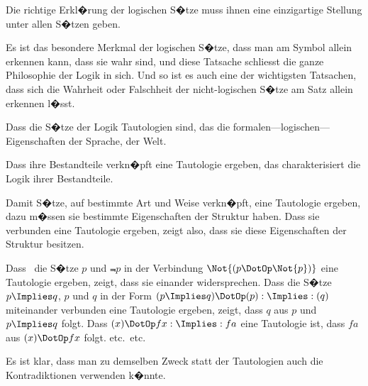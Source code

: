\begin{propositions}
{Die richtige Erkl�rung der logischen S�tze
muss ihnen eine einzigartige Stellung unter allen
S�tzen geben.}


{Es ist das besondere Merkmal der logischen
S�tze, dass man am Symbol allein erkennen kann,
dass sie wahr sind, und diese Tatsache schliesst
die ganze Philosophie der Logik in sich. Und
so ist es auch eine der wichtigsten Tatsachen, dass
sich die Wahrheit oder Falschheit der nicht-logischen
S�tze  am Satz allein erkennen
l�sst.}


{Dass die S�tze der Logik Tautologien sind,
das  die for\-ma\-len---lo\-gi\-schen---Ei\-gen\-schaf\-ten
der Sprache, der Welt.

Dass ihre Bestandteile  verkn�pft eine Tautologie
ergeben, das charakterisiert die Logik ihrer
Bestandteile.

Damit S�tze, auf bestimmte Art und Weise
verkn�pft, eine Tautologie ergeben, dazu m�ssen
sie bestimmte Eigenschaften der Struktur haben.
Dass sie  verbunden eine Tautologie ergeben,
zeigt also, dass sie diese Eigenschaften der Struktur
besitzen.}


{Dass \zumBeispiel\ die S�tze \glqq{}$p$\grqq{} und \glqq{}$\Not{p}$\grqq{} in der
Verbindung \glqq{}$\Not{(p \DotOp \Not{p})}$\grqq{} eine Tautologie ergeben,
zeigt, dass sie einander widersprechen. Dass
die S�tze \glqq{}$p \Implies q$\grqq{}, \glqq{}$p$\grqq{} und \glqq{}$q$\grqq{} in der Form
\glqq{}$(p \Implies q) \DotOp (p) : \Implies : (q)$\grqq{} miteinander verbunden eine
Tautologie ergeben, zeigt, dass $q$ aus $p$ und $p \Implies q$
folgt. Dass \glqq{}$(x) \DotOp fx : \Implies : fa$\grqq{} eine Tautologie ist,
dass $fa$ aus $(x) \DotOp fx$ folgt.{} etc.\ etc.}


{Es ist klar, dass man zu demselben Zweck statt
der Tautologien auch die Kontradiktionen verwenden
k�nnte.}



\end{propositions}
